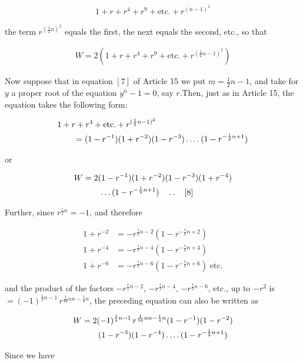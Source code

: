 \[
\begin{aligned}
1+r+r^4+r^9+\text{etc.}+r^{(n-1)^2}
\end{aligned}
\]

the term $r^{(\frac12n)^2}$ equals the first, the next equals the second, etc., so that

\[
\begin{aligned}
W=2(1+r+r^4+r^9+\text{etc.}+r^{(\frac12n-1)^2})
\end{aligned}
\]

Now suppose that in equation $[7]$ of Article 15 we put $m=\frac12n-1$, and take for $y$ a proper root of the equation $y^n-1=0$, say $r$.\quad Then, just as in Article 15, the equation takes the following form:

\[
\begin{aligned}
&1+r+r^4+\text{etc.}+r^{(\frac12n-1)^2}\\&\qquad=(1-r^{-1})(1+r^{-2})(1-r^{-3})\mathinner{.\,.\,.\,.}(1-r^{-\frac12n+1})
\end{aligned}
\]


or

\[
\begin{aligned}
W&=2(1-r^{-1})(1+r^{-2})(1-r^{-3})(1+r^{-4})\\&\qquad\ldots(1-r^{-\frac12n+1})\quad\mathinner{.\,.}\quad[8]
\end{aligned}
\]

Further, since $r^{\frac12n}=-1$, and therefore

\[
\begin{aligned}
1+r^{-2}&=-r^{\frac12n-2}(1-r^{-\frac12n+2})\\
1+r^{-4}&=-r^{\frac12n-4}(1-r^{-\frac12n+4})\\
1+r^{-6}&=-r^{\frac12n-6}(1-r^{-\frac12n+6})\;\text{etc.}
\end{aligned}
\]

and the product of the factors $-r^{\frac12n-2}$, $-r^{\frac12n-4}$, $-r^{\frac12n-6}$, etc., up to $-r^2$ is $=(-1)^{\frac14n-1}\,r^{\frac1{16}nn-\frac14n}$, the preceding equation can also be written as

\[
\begin{aligned}
W&=2(-1)^{\frac14n-1}\,r^{\frac1{16}nn-\frac14n}(1-r^{-1})(1-r^{-2})\\&\qquad(1-r^{-3})(1-r^{-4})\mathinner{.\,.\,.\,.}(1-r^{-\frac12n+1})
\end{aligned}
\]

Since we have

